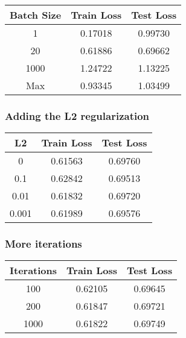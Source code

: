 \documentclass[
	letterpaper, %
	10pt, %
]{class}
\begin{document}
\begin{center}
	\begin{tabular}{ |c|c|c| }
		\hline
		Batch Size & Train Loss & Test Loss \\
		\hline
		1          & 0.17018    & 0.99730   \\
		20         & 0.61886    & 0.69662   \\
		1000       & 1.24722    & 1.13225   \\
		Max        & 0.93345    & 1.03499   \\
		\hline
	\end{tabular}
\end{center}

\subsubsection{Adding the L2 regularization}

\begin{center}
	\begin{tabular}{ |c|c|c| }
		\hline
		L2    & Train Loss & Test Loss \\
		\hline
		0     & 0.61563    & 0.69760   \\
		0.1   & 0.62842    & 0.69513   \\
		0.01  & 0.61832    & 0.69720   \\
		0.001 & 0.61989    & 0.69576   \\
		\hline
	\end{tabular}
\end{center}

\subsubsection{More iterations}

\begin{center}
	\begin{tabular}{ |c|c|c| }
		\hline
		Iterations & Train Loss & Test Loss \\
		\hline
		100        & 0.62105    & 0.69645   \\
		200        & 0.61847    & 0.69721   \\
		1000       & 0.61822    & 0.69749   \\
		\hline
	\end{tabular}
\end{center}
\end{document}
